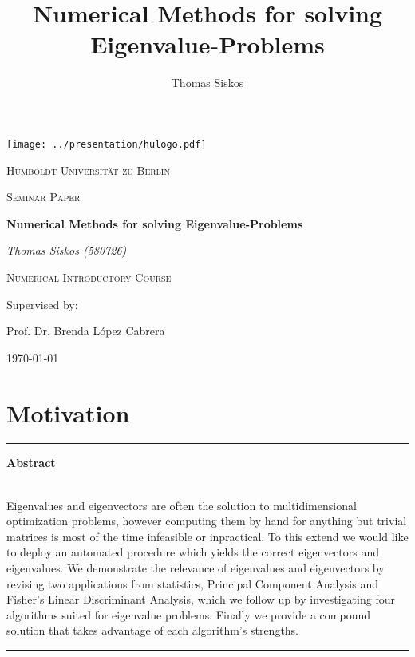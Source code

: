 \documentclass[12pt]{article}
\renewenvironment{abstract}{%

\begin{center}
\begin{minipage}{0.9\textwidth}
\rule{\textwidth}{1pt}}
{\par\noindent\rule{\textwidth}{1pt}
\end{minipage}
\end{center}}
\begin{document}
\title{Numerical Methods for solving Eigenvalue-Problems}
\author{Thomas Siskos}
\date{}

\begin{titlepage}
  \begin{center}

  \texttt{[image: ../presentation/hulogo.pdf]} \par
  {\scshape\LARGE Humboldt Universit{\"a}t zu Berlin \par}

  {\scshape\Large Seminar Paper\par}

  {\huge\bfseries Numerical Methods for solving Eigenvalue-Problems\par}

\vspace{1cm}

  {\Large\itshape Thomas Siskos (580726)\par}

  {\Large\scshape Numerical Introductory Course\par}

  \vfill
  Supervised by: \par
  {\Large Prof. Dr. Brenda L{\'o}pez Cabrera \par}
  \vfill
  {\large \today\par}
  \end{center}

\end{titlepage}

\tableofcontents
\newpage
\listofalgorithms
\listoffigures
\listoftables
\newpage

\section{Motivation}

\begin{singlespacing}
\begin{abstract}
\centerline{\textbf{Abstract}} \\
\small
Eigenvalues and eigenvectors are often the solution to multidimensional optimization problems, however computing them by hand for anything but trivial matrices is most of the time infeasible or inpractical. To this extend we would like to deploy an automated procedure which yields the correct eigenvectors and eigenvalues. We demonstrate the relevance of eigenvalues and eigenvectors by revising two applications from statistics, Principal Component Analysis and Fisher's Linear Discriminant Analysis, which we follow up by investigating four algorithms suited for eigenvalue problems. Finally we provide a compound solution that takes advantage of each algorithm's strengths.
\end{abstract}
\vspace{3mm}
\end{singlespacing}
\end{document}
